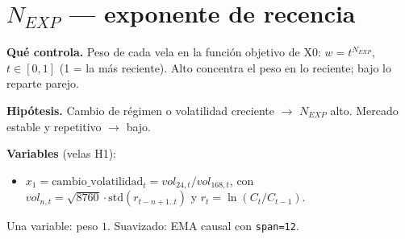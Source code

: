 \documentclass[11pt,a4paper]{article}
\newcommand{\code}[1]{\texttt{\small #1}}
\begin{document}
\section*{$N_{EXP}$ --- exponente de recencia}

\textbf{Qué controla.} Peso de cada vela en la función objetivo de X0: $w=t^{N_{EXP}}$, $t\in[0,1]$ (1 = la más reciente). Alto concentra el peso en lo reciente; bajo lo reparte parejo.

\textbf{Hipótesis.} Cambio de régimen o volatilidad creciente $\rightarrow$ $N_{EXP}$ alto. Mercado estable y repetitivo $\rightarrow$ bajo.

\textbf{Variables} (velas H1):
\begin{itemize}\setlength{\itemsep}{1pt}\setlength{\topsep}{1pt}
\item $x_1=\text{cambio\_volatilidad}_t=vol_{24,t}/vol_{168,t}$, con $vol_{n,t}=\sqrt{8760}\cdot\text{std}(r_{t-n+1..t})$ y $r_t=\ln(C_t/C_{t-1})$.
\end{itemize}
Una variable: peso $1$. Suavizado: EMA causal con \code{span=12}.
\end{document}
